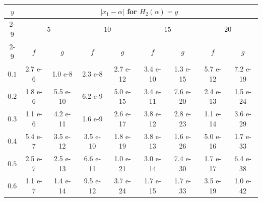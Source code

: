 \documentclass{article}
\begin{document}
\begin{table}[t!]
\begin{tabular}{|c|cccccccc|}
	\hline
	\multirow{3}{*}{$y$} & \multicolumn{8}{c|}{$|x_{1}-\alpha|$ for $H_{2}(\alpha)=y$}                                                                                                                                                                             \\ \cline{2-9} 
	& \multicolumn{2}{c|}{$5$}                                     & \multicolumn{2}{c|}{$10$}                                     & \multicolumn{2}{c|}{$15$}                                     & \multicolumn{2}{c|}{$20$}                \\ \cline{2-9} 
	& \multicolumn{1}{c|}{$f$}     & \multicolumn{1}{c|}{$g$}      & \multicolumn{1}{c|}{$f$}      & \multicolumn{1}{c|}{$g$}      & \multicolumn{1}{c|}{$f$}      & \multicolumn{1}{c|}{$g$}      & \multicolumn{1}{c|}{$f$}      & $g$      \\ \hline
	$0.1$                & \multicolumn{1}{c|}{2.7 e-6} & \multicolumn{1}{c|}{1.0 e-8}  & \multicolumn{1}{c|}{2.3 e-8}  & \multicolumn{1}{c|}{2.7 e-12} & \multicolumn{1}{c|}{3.4 e-10} & \multicolumn{1}{c|}{1.3 e-15} & \multicolumn{1}{c|}{5.7 e-12} & 7.2 e-19 \\ \hline
	$0.2$                & \multicolumn{1}{c|}{1.8 e-6} & \multicolumn{1}{c|}{5.5 e-10} & \multicolumn{1}{c|}{6.2 e-9}  & \multicolumn{1}{c|}{5.0 e-15} & \multicolumn{1}{c|}{3.4 e-11} & \multicolumn{1}{c|}{7.6 e-20} & \multicolumn{1}{c|}{2.4 e-13} & 1.5 e-24 \\ \hline
	$0.3$                & \multicolumn{1}{c|}{1.1 e-6} & \multicolumn{1}{c|}{4.2 e-11} & \multicolumn{1}{c|}{1.6 e-9}  & \multicolumn{1}{c|}{2.6 e-17} & \multicolumn{1}{c|}{3.8 e-12} & \multicolumn{1}{c|}{2.8 e-23} & \multicolumn{1}{c|}{1.1 e-14} & 3.6 e-29 \\ \hline
	$0.4$                & \multicolumn{1}{c|}{5.4 e-7} & \multicolumn{1}{c|}{3.5 e-12} & \multicolumn{1}{c|}{3.5 e-10} & \multicolumn{1}{c|}{1.8 e-19} & \multicolumn{1}{c|}{3.8 e-13} & \multicolumn{1}{c|}{1.6 e-26} & \multicolumn{1}{c|}{5.0 e-16} & 1.7 e-33 \\ \hline
	$0.5$                & \multicolumn{1}{c|}{2.5 e-7} & \multicolumn{1}{c|}{2.5 e-13} & \multicolumn{1}{c|}{6.6 e-11} & \multicolumn{1}{c|}{1.0 e-21} & \multicolumn{1}{c|}{3.0 e-14} & \multicolumn{1}{c|}{7.4 e-30} & \multicolumn{1}{c|}{1.7 e-17} & 6.4 e-38 \\ \hline
	$0.6$             & \multicolumn{1}{c|}{1.1 e-7} & \multicolumn{1}{c|}{1.4 e-14} & \multicolumn{1}{c|}{9.5 e-12} & \multicolumn{1}{c|}{3.7 e-24} & \multicolumn{1}{c|}{1.7 e-15} & \multicolumn{1}{c|}{1.7 e-33} & \multicolumn{1}{c|}{3.5 e-19} & 1.0 e-42 \\ \hline

\end{tabular}
\end{table}
\end{document}
